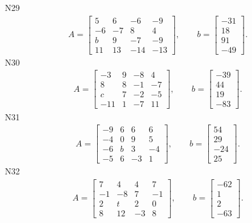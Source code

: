 \documentclass[11pt]{report}
\begin{document}
N29
\begin{align*}
 A = \left[\begin{matrix}5 & 6 & -6 & -9\\-6 & -7 & 8 & 4\\b & 9 & -7 & -9\\11 & 13 & -14 & -13\end{matrix}\right],
\qquad b = \left[\begin{matrix}-31\\18\\91\\-49\end{matrix}\right]. 
 \end{align*}
N30
\begin{align*}
 A = \left[\begin{matrix}-3 & 9 & -8 & 4\\8 & 8 & -1 & -7\\c & 7 & -2 & -5\\-11 & 1 & -7 & 11\end{matrix}\right],
\qquad b = \left[\begin{matrix}-39\\44\\19\\-83\end{matrix}\right]. 
 \end{align*}
N31
\begin{align*}
 A = \left[\begin{matrix}-9 & 6 & 6 & 6\\-4 & 0 & 9 & 5\\-6 & b & 3 & -4\\-5 & 6 & -3 & 1\end{matrix}\right],
\qquad b = \left[\begin{matrix}54\\29\\-24\\25\end{matrix}\right]. 
 \end{align*}
N32
\begin{align*}
 A = \left[\begin{matrix}7 & 4 & 4 & 7\\-1 & -8 & 7 & -1\\2 & t & 2 & 0\\8 & 12 & -3 & 8\end{matrix}\right],
\qquad b = \left[\begin{matrix}-62\\1\\2\\-63\end{matrix}\right]. 
 \end{align*}
\end{document}

